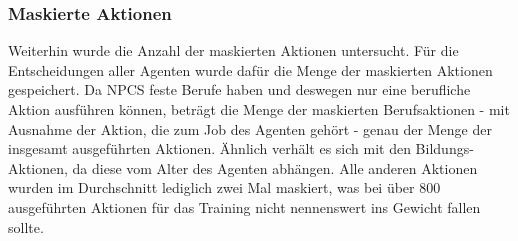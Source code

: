 \subsubsection{Maskierte Aktionen}
Weiterhin wurde die Anzahl der maskierten Aktionen untersucht. Für die Entscheidungen aller Agenten wurde dafür die Menge der maskierten Aktionen gespeichert. Da NPCS feste Berufe haben und deswegen nur eine berufliche Aktion ausführen können, beträgt die Menge der maskierten Berufsaktionen - mit Ausnahme der Aktion, die zum Job des Agenten gehört - genau der Menge der insgesamt ausgeführten Aktionen. Ähnlich verhält es sich mit den Bildungs-Aktionen, da diese vom Alter des Agenten abhängen. Alle anderen Aktionen wurden im Durchschnitt lediglich zwei Mal maskiert, was bei über 800 ausgeführten Aktionen für das Training nicht nennenswert ins Gewicht fallen sollte.